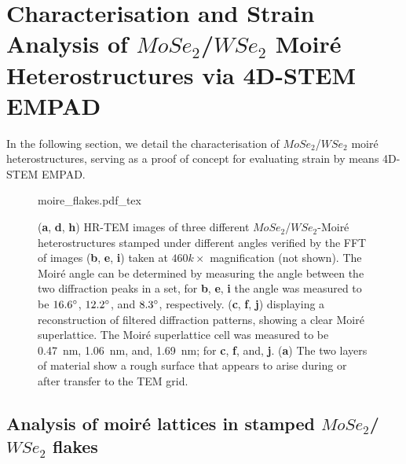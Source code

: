 \section{Characterisation and Strain Analysis of $MoSe_2$/$WSe_2$ Moiré Heterostructures via 4D-STEM EMPAD}
\label{sec:results}



In the following section, we detail the characterisation of $MoSe_2$/$WSe_2$ moiré heterostructures, serving as a proof of concept for evaluating strain by means 4D-STEM EMPAD.

\begin{figure}[p]
    \centering
    \def\svgwidth{.9\linewidth}
    {moire_flakes.pdf_tex}
    \caption{(\textbf{a}, \textbf{d}, \textbf{h}) HR-TEM images of three different $MoSe_2$/$WSe_2$-Moiré heterostructures stamped under different angles verified by the FFT of images (\textbf{b}, \textbf{e}, \textbf{i}) taken at $460k\times$ magnification (not shown). The Moiré angle can be determined by measuring the angle between the two diffraction peaks in a set, for \textbf{b}, \textbf{e}, \textbf{i} the angle was measured to be $16.6\degree$, $12.2\degree$, and $8.3\degree$, respectively. (\textbf{c}, \textbf{f}, \textbf{j}) displaying a reconstruction of filtered diffraction patterns, showing a clear Moiré superlattice. The Moiré superlattice cell was measured to be \SI{0.47}{nm}, \SI{1.06}{nm}, and, \SI{1.69}{nm}; for \textbf{c}, \textbf{f}, and, \textbf{j}. (\textbf{a}) The two layers of material show a rough surface that appears to arise during or after transfer to the TEM grid.}
    \label{fig:moire_overview}
\end{figure}

\subsection{Analysis of moiré lattices in stamped $MoSe_2$/$WSe_2$ flakes}

